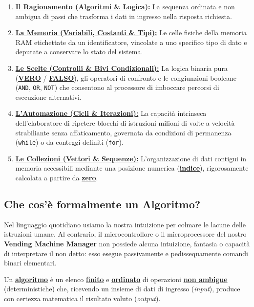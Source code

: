 \begin{enumerate}
  \item \textbf{\underline{Il Ragionamento (Algoritmi \& Logica):}} La sequenza ordinata e non ambigua di passi che trasforma i dati in ingresso nella risposta richiesta.
  \item \textbf{\underline{La Memoria (Variabili, Costanti \& Tipi):}} Le celle fisiche della memoria RAM etichettate da un identificatore, vincolate a uno specifico tipo di dato e deputate a conservare lo stato del sistema.
  \item \textbf{\underline{Le Scelte (Controlli \& Bivi Condizionali):}} La logica binaria pura (\textbf{\underline{VERO}} / \textbf{\underline{FALSO}}), gli operatori di confronto e le congiunzioni booleane (\texttt{AND}, \texttt{OR}, \texttt{NOT}) che consentono al processore di imboccare percorsi di esecuzione alternativi.
  \item \textbf{\underline{L'Automazione (Cicli \& Iterazioni):}} La capacità intrinseca dell'elaboratore di ripetere blocchi di istruzioni milioni di volte a velocità strabiliante senza affaticamento, governata da condizioni di permanenza (\texttt{while}) o da conteggi definiti (\texttt{for}).
  \item \textbf{\underline{Le Collezioni (Vettori \& Sequenze):}} L'organizzazione di dati contigui in memoria accessibili mediante una posizione numerica (\textbf{\underline{indice}}), rigorosamente calcolata a partire da \textbf{\underline{zero}}.
\end{enumerate}

\subsection{Che cos'è formalmente un Algoritmo?}

Nel linguaggio quotidiano usiamo la nostra intuizione per colmare le lacune delle istruzioni umane. Al contrario, il microcontrollore o il microprocessore del nostro \textbf{Vending Machine Manager} non possiede alcuna intuizione, fantasia o capacità di interpretare il non detto: esso esegue passivamente e pedissequamente comandi binari elementari.

\begin{concetto}
Un \textbf{\underline{algoritmo}} è un elenco \textbf{\underline{finito}} e \textbf{\underline{ordinato}} di operazioni \textbf{\underline{non ambigue}} (deterministiche) che, ricevendo un insieme di dati di ingresso (\emph{input}), produce con certezza matematica il risultato voluto (\emph{output}).
\end{concetto}

